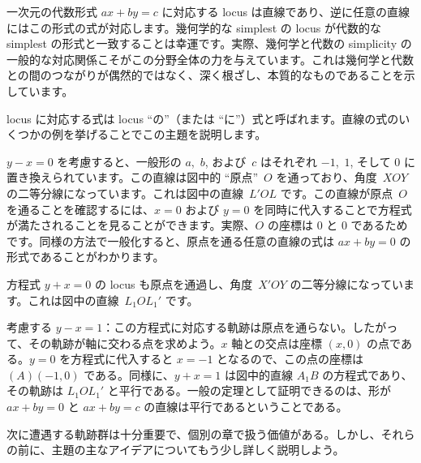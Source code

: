 \documentclass[a4paper,11pt,openany]{ltjsbook}
\begin{document}
一次元の代数形式 $ax + by = c$ に対応する locus は直線であり、逆に任意の直線にはこの形式の式が対応します。幾何学的な simplest の locus が代数的な simplest の形式と一致することは幸運です。実際、幾何学と代数の simplicity の一般的な対応関係こそがこの分野全体の力を与えています。これは幾何学と代数との間のつながりが偶然的ではなく、深く根ざし、本質的なものであることを示しています。

locus に対応する式は locus ``の''（または ``に''）式と呼ばれます。直線の式のいくつかの例を挙げることでこの主題を説明します。

$y - x = 0$ を考慮すると、一般形の $a$,~$b$, および~$c$ はそれぞれ $-1$,~$1$, そして $0$ に置き換えられています。この直線は図中的 ``原点''~$O$ を通っており、角度~$XOY$ の二等分線になっています。これは図中の直線~$L'OL$ です。この直線が原点~$O$ を通ることを確認するには、$x = 0$ および $y = 0$ を同時に代入することで方程式が満たされることを見ることができます。実際、$O$ の座標は $0$ と $0$ であるためです。同様の方法で一般化すると、原点を通る任意の直線の式は $ax + by = 0$ の形式であることがわかります。

方程式 $y + x = 0$ の locus も原点を通過し、角度~$X'OY$ の二等分線になっています。これは図中の直線~$L_{1}OL_{1}'$ です。

考慮する $y - x = 1$：この方程式に対応する軌跡は原点を通らない。したがって、その軌跡が軸に交わる点を求めよう。$x$ 軸との交点は座標 $(x, 0)$ の点である。$y = 0$ を方程式に代入すると $x = -1$ となるので、この点の座標は $(A) (-1, 0)$ である。同様に、$y + x = 1$ は図中的直線 $A_{1}B$ の方程式であり、その軌跡は $L_{1}OL_{1}'$ と平行である。一般の定理として証明できるのは、形が $ax + by = 0$ と $ax + by = c$ の直線は平行であるということである。

次に遭遇する軌跡群は十分重要で、個別の章で扱う価値がある。しかし、それらの前に、主題の主なアイデアについてもう少し詳しく説明しよう。
\end{document}
